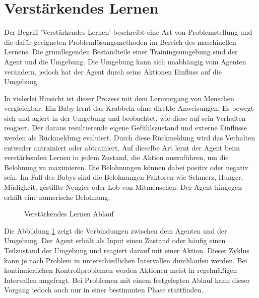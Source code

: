 \section{Verstärkendes Lernen}
\label{sec:rl}
Der Begriff 'Verstärkendes Lernen' beschreibt eine Art von Problemstellung und die dafür geeigneten Problemlösungsmethoden im Bereich des maschinellen Lernens. Die grundlegenden Bestandteile einer Trainingsumgebung sind der Agent und die Umgebung. Die Umgebung kann sich unabhängig vom Agenten verändern, jedoch hat der Agent durch seine Aktionen Einfluss auf die Umgebung.

In vielerlei Hinsicht ist dieser Prozess mit dem Lernvorgang von Menschen vergleichbar. Ein Baby lernt das Krabbeln ohne direkte Anweisungen. Es bewegt sich und agiert in der Umgebung und beobachtet, wie diese auf sein Verhalten reagiert. Der daraus resultierende eigene Gefühlszustand und externe Einflüsse werden als Rückmeldung evaluiert. Durch diese Rückmeldung wird das Verhalten entweder antrainiert oder abtrainiert. Auf dieselbe Art lernt der Agent beim verstärkenden Lernen in jedem Zustand, die Aktion auszuführen, um die Belohnung zu maximieren. Die Belohnungen können dabei positiv oder negativ sein. Im Fall des Babys sind die Belohnungen Faktoren wie Schmerz, Hunger, Müdigkeit, gestillte Neugier oder Lob von Mitmenschen. Der Agent hingegen erhält eine numerische Belohnung.\cite{sutton2018reinforcement}

\begin{figure}[H]
  \centering
  \caption{Verstärkendes Lernen Ablauf}
  \label{fig:vl_ablauf}
\end{figure}

Die Abbildung \ref{fig:vl_ablauf} zeigt die Verbindungen zwischen dem Agenten und der Umgebung. Der Agent erhält als Input einen Zustand oder häufig einen Teilzustand der Umgebung und reagiert darauf mit einer Aktion. Dieser Zyklus kann je nach Problem in unterschiedlichen Intervallen durchlaufen werden. Bei kontinuierlichen Kontrollproblemen werden Aktionen meist in regelmäßigen Intervallen angefragt. Bei Problemen mit einem festgelegten Ablauf kann dieser Vorgang jedoch auch nur in einer bestimmten Phase stattfinden.

\newpage